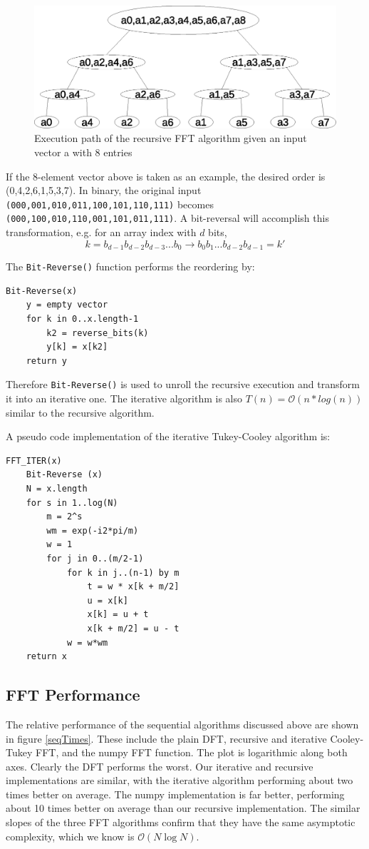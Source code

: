 \begin{figure}[h]
\center
\includegraphics[scale=0.5]{img/recursive_fft_execution.eps}
\caption{Execution path of the recursive FFT algorithm given an input vector a with 8 entries}
\end{figure}

If the 8-element vector above is taken as an example, the desired order is (0,4,2,6,1,5,3,7). In binary, the original input \texttt{(000,001,010,011,100,101,110,111)} becomes \texttt{(000,100,010,110,001,101,011,111)}. A bit-reversal will accomplish this transformation, e.g. for an array index with $d$ bits,
\[
k = b_{d-1}b_{d-2}b_{d-3}...b_0 \rightarrow b_0b_1...b_{d-2}b_{d-1} = k'
\]

The \texttt{Bit-Reverse()} function performs the reordering by:
\begin{lstlisting}
Bit-Reverse(x)
    y = empty vector
    for k in 0..x.length-1
        k2 = reverse_bits(k)
        y[k] = x[k2]
    return y
\end{lstlisting}

Therefore \texttt{Bit-Reverse()} is used to unroll the recursive execution and transform it into an iterative one. The iterative algorithm is also $T(n) = \mathcal{O}(n * log(n))$ similar to the recursive algorithm.

A pseudo code implementation of the iterative Tukey-Cooley algorithm is:
\begin{lstlisting}
FFT_ITER(x)
    Bit-Reverse (x)
    N = x.length
    for s in 1..log(N)
        m = 2^s
        wm = exp(-i2*pi/m)
        w = 1
        for j in 0..(m/2-1)
            for k in j..(n-1) by m
                t = w * x[k + m/2]
                u = x[k]
                x[k] = u + t
                x[k + m/2] = u - t
            w = w*wm
    return x
\end{lstlisting}

\subsection{FFT Performance}
The relative performance of the sequential algorithms discussed above are shown in figure \ref{seqTimes}. These include the plain DFT, recursive and iterative Cooley-Tukey FFT, and the numpy FFT function. The plot is logarithmic along both axes. Clearly the DFT performs the worst. Our iterative and recursive implementations are similar, with the iterative algorithm performing about two times better on average. The numpy implementation is far better, performing about 10 times better on average than our recursive implementation. The similar slopes of the three FFT algorithms confirm that they have the same asymptotic complexity, which we know is $\mathcal{O}(N\log N)$.

